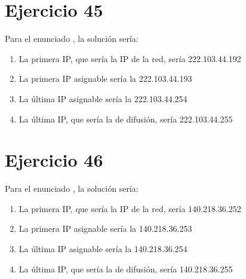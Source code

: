\documentclass[letterpaper,10pt,spanish]{sphinxmanual}
\begin{document}
\section{Ejercicio 45}
\label{\detokenize{t2_integracion_elementos/ejercicios_subredes_ipv4/rangos_direcciones:id45}}
\sphinxAtStartPar
Para el enunciado , la solución sería:
\begin{enumerate}
%
\item {} 
\sphinxAtStartPar
La primera IP, que sería la IP de la red, sería 222.103.44.192

\item {} 
\sphinxAtStartPar
La primera IP asignable sería la 222.103.44.193

\item {} 
\sphinxAtStartPar
La última IP asignable sería la 222.103.44.254

\item {} 
\sphinxAtStartPar
La última IP, que sería la de difusión, sería 222.103.44.255

\end{enumerate}


\section{Ejercicio 46}
\label{\detokenize{t2_integracion_elementos/ejercicios_subredes_ipv4/rangos_direcciones:id46}}
\sphinxAtStartPar
Para el enunciado , la solución sería:
\begin{enumerate}
%
\item {} 
\sphinxAtStartPar
La primera IP, que sería la IP de la red, sería 140.218.36.252

\item {} 
\sphinxAtStartPar
La primera IP asignable sería la 140.218.36.253

\item {} 
\sphinxAtStartPar
La última IP asignable sería la 140.218.36.254

\item {} 
\sphinxAtStartPar
La última IP, que sería la de difusión, sería 140.218.36.255

\end{enumerate}
\end{document}
